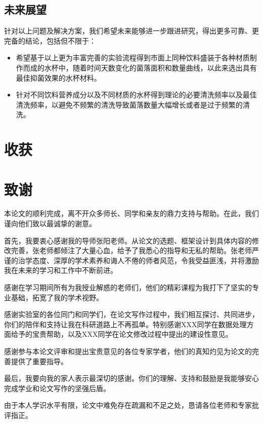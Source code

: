 \documentclass[12pt,a4paper]{article}
\begin{document}
\subsection{未来展望}
针对以上问题及解决方案，我们希望未来能够进一步跟进研究，得出更多可靠、更完备的结论，包括但不限于：
\begin{itemize}
    \item 希望基于以上更为丰富完善的实验流程得到市面上同种饮料盛装于各种材质制作而成的水杯中，随着时间天数变化的菌落面积和数量曲线，以此来选出具有最佳抑菌效果的水杯材料。
    \item 针对不同饮料营养成分以及不同材质的水杯得到理论的必要清洗频率以及最佳清洗频率，以避免不频繁的清洗导致菌落数量大幅增长或者是过于频繁的清洗。
\end{itemize}

\section{收获}

\clearpage
\thispagestyle{empty} 
\section*{致谢} %

本论文的顺利完成，离不开众多师长、同学和亲友的鼎力支持与帮助。在此，我们谨向他们致以最诚挚的谢意。

首先，我要衷心感谢我的导师张阳老师。从论文的选题、框架设计到具体内容的修改完善，张老师都倾注了大量心血，给予了我悉心的指导和无私的帮助。张老师严谨的治学态度、深厚的学术素养和诲人不倦的师者风范，令我受益匪浅，并将激励我在未来的学习和工作中不断前进。

感谢在学习期间所有为我授业解惑的老师们，他们的精彩课程为我打下了坚实的专业基础，拓宽了我的学术视野。

感谢实验室的各位同门和同学们，在论文写作过程中，我们相互探讨、共同进步，你们的陪伴和支持让我在科研道路上不再孤单。特别感谢XXX同学在数据处理方面给予的宝贵帮助，以及XXX同学在论文修改过程中提出的建设性意见。

感谢参与本论文评审和提出宝贵意见的各位专家学者，他们的真知灼见为论文的完善提供了重要指导。

最后，我要向我的家人表示最深切的感谢。你们的理解、支持和鼓励是我能够安心完成学业和论文写作的坚强后盾。

由于本人学识水平有限，论文中难免存在疏漏和不足之处，恳请各位老师和专家批评指正。

\end{document}
